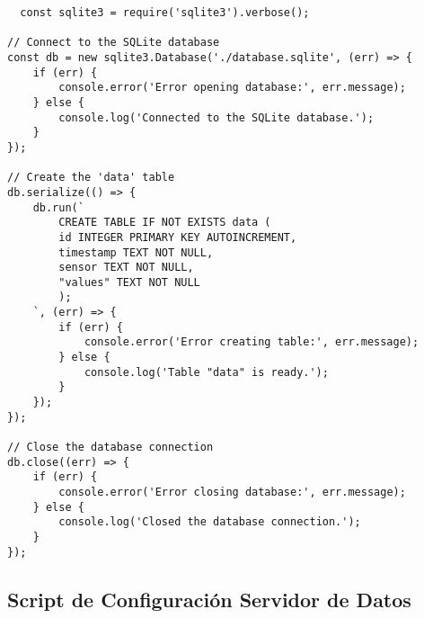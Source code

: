 \begin{verbatim}
  const sqlite3 = require('sqlite3').verbose();

// Connect to the SQLite database
const db = new sqlite3.Database('./database.sqlite', (err) => {
    if (err) {
        console.error('Error opening database:', err.message);
    } else {
        console.log('Connected to the SQLite database.');
    }
});

// Create the 'data' table
db.serialize(() => {
    db.run(`
        CREATE TABLE IF NOT EXISTS data (
        id INTEGER PRIMARY KEY AUTOINCREMENT,
        timestamp TEXT NOT NULL,
        sensor TEXT NOT NULL,
        "values" TEXT NOT NULL
        );
    `, (err) => {
        if (err) {
            console.error('Error creating table:', err.message);
        } else {
            console.log('Table "data" is ready.');
        }
    });
});

// Close the database connection
db.close((err) => {
    if (err) {
        console.error('Error closing database:', err.message);
    } else {
        console.log('Closed the database connection.');
    }
});

\end{verbatim}


\subsection{Script de Configuración Servidor de Datos}

